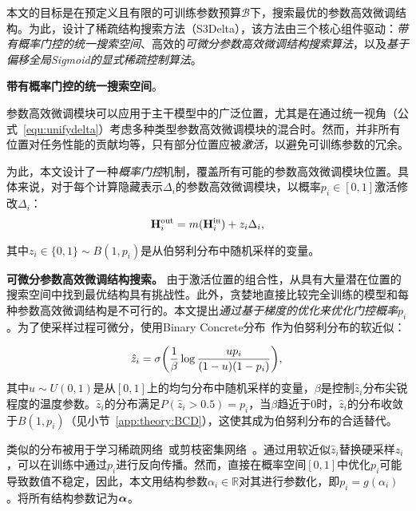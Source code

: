 本文的目标是在预定义且有限的可训练参数预算$\mathcal{B}$下，搜索最优的参数高效微调结构。为此，设计了稀疏结构搜索方法（S3Delta），该方法由三个核心组件驱动：\emph{带有概率门控的统一搜索空间}、高效的\emph{可微分参数高效微调结构搜索算法}，以及\emph{基于偏移全局Sigmoid的显式稀疏控制算法}。


\textbf{带有概率门控的统一搜索空间}。
\label{sec:meth:searchspace}

参数高效微调模块可以应用于主干模型中的广泛位置，尤其是在通过统一视角（公式~\eqref{equ:unifydelta}）考虑多种类型参数高效微调模块的混合时。然而，并非所有位置对任务性能的贡献均等，只有部分位置应被\emph{激活}，以避免可训练参数的冗余。

为此，本文设计了一种\emph{概率门控}机制，覆盖所有可能的参数高效微调模块位置。具体来说，对于每个计算隐藏表示$\Delta_i$的参数高效微调模块，以概率$p_i\in [0,1]$激活修改$\Delta_i$：
\begin{equation}
\small
    \mathbf{H}^{\text{out}}_i = m(\mathbf{H}^{\text{in}}_i) + z_i \Delta_i,
\end{equation}

其中$z_i \in \{0,1\}\sim {B}(1,p_i)$是从伯努利分布中随机采样的变量。


\textbf{可微分参数高效微调结构搜索。} 由于激活位置的组合性，从具有大量潜在位置的搜索空间中找到最优结构具有挑战性。此外，贪婪地直接比较完全训练的模型和每种参数高效微调结构是不可行的。本文提出\emph{通过基于梯度的优化来优化门控概率$p_i$}。为了使采样过程可微分，使用Binary Concrete分布~\cite{maddison2016concrete,jang2016categorical}作为伯努利分布的软近似：

\begin{equation}
\small
\label{equ:zhat}
    \hat{z}_i  = \sigma{\left(\frac{1}\beta \operatorname{log}\frac{u p_i}{(1-u)(1-p_i)}\right)}, \\
\end{equation}
其中$u\sim U(0,1)$是从$[0,1]$上的均匀分布中随机采样的变量，$\beta$是控制$\hat{z}_i$分布尖锐程度的温度参数。{$\hat{z}_i$的分布满足$P(\hat{z}_i > 0.5) = p_i$，当$\beta$趋近于$0$时，$\hat{z}_i$的分布收敛于${B}(1, p_i)$（见小节~\ref{app:theory:BCD}），这使其成为伯努利分布的合适替代。}

类似的分布被用于学习稀疏网络~\cite{louizos2017learning}或剪枝密集网络~\cite{wang2019structured}。通过用软近似$\hat{z}_i$替换硬采样$z_i$，可以在训练中通过$p_i$进行反向传播。然而，直接在概率空间$[0,1]$中优化$p_i$可能导致数值不稳定，因此，本文用结构参数$\alpha_i\in \mathbb{R}$对其进行参数化，即$p_i = g(\alpha_i)$。将所有结构参数记为$\boldsymbol{\alpha}$。

